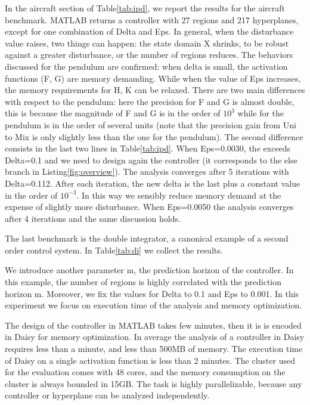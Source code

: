 In the aircraft section of Table\ref{tab:ipd}, we report the results for the aircraft benchmark.
MATLAB returns a controller with 27 regions and 217 hyperplanes, except for one combination of Delta and Eps. In general, when the disturbance value raises, two things can happen: the state domain X shrinks, to be robust against a greater disturbance, or the number of regions reduces.
The behaviors discussed for the pendulum are confirmed: when delta is small, the activation functions (F, G) are memory demanding. While when the value of Eps increases, the memory requirements for H, K can be relaxed. There are two main differences with respect to the pendulum: here the precision for F and G is almost double, this is because the magnitude of F and G is in the order of $10^{3}$ while for the pendulum is in the order of several units (note that the precision gain from Uni to Mix is only slightly less than the one for the pendulum). The second difference consists in the last two lines in Table\ref{tab:ipd}.
When Eps=0.0030, the \maxUij exceeds Delta=0.1 and we need to design again the controller (it corresponds to the else branch in Listing\ref{fig:overview}). The analysis converges after 5 iterations with Delta=0.112.
After each iteration, the new delta is the last \maxUij\space plus a constant value in the order of $10^{-3}$. In this way we sensibly reduce memory demand at the expense of slightly more disturbance. When Eps=0.0050 the analysis converges after 4 iterations and the same discussion holds.

The last benchmark is the double integrator, a canonical example of a second order control system. In Table\ref{tab:di} we collect the results.

We introduce another parameter m, the prediction horizon of the controller. In this example, the number of regions is highly correlated with the prediction horizon m.
Moreover, we fix the values for Delta to 0.1 and Eps to 0.001. In this experiment we focus on execution time of the analysis and memory optimization.

The design of the controller in MATLAB takes few minutes, then it is is encoded in Daisy for memory optimization. In average the analysis of a controller in Daisy requires less than a minute, and less than 500MB of memory. The execution time of Daisy on a single activation function is less than 2 minutes. The cluster used for the evaluation comes with 48 cores, and the memory consumption on the cluster is always bounded in 15GB. The task is highly parallelizable, because any controller or hyperplane can be analyzed independently.

